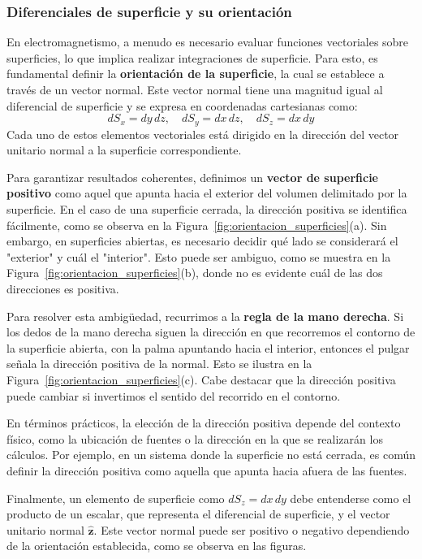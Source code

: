 \documentclass{book}
\begin{document}
\subsubsection{Diferenciales de superficie y su orientación}

En electromagnetismo, a menudo es necesario evaluar funciones vectoriales sobre superficies, lo que implica realizar integraciones de superficie. Para esto, es fundamental definir la \textbf{orientación de la superficie}, la cual se establece a través de un vector normal. Este vector normal tiene una magnitud igual al diferencial de superficie y se expresa en coordenadas cartesianas como:
\begin{equation}
dS_x = dy\,dz, \quad dS_y = dx\,dz, \quad dS_z = dx\,dy
\end{equation}
Cada uno de estos elementos vectoriales está dirigido en la dirección del vector unitario normal a la superficie correspondiente.

Para garantizar resultados coherentes, definimos un \textbf{vector de superficie positivo} como aquel que apunta hacia el exterior del volumen delimitado por la superficie. En el caso de una superficie cerrada, la dirección positiva se identifica fácilmente, como se observa en la Figura~\ref{fig:orientacion_superficies}(a). Sin embargo, en superficies abiertas, es necesario decidir qué lado se considerará el "exterior" y cuál el "interior". Esto puede ser ambiguo, como se muestra en la Figura~\ref{fig:orientacion_superficies}(b), donde no es evidente cuál de las dos direcciones es positiva.

Para resolver esta ambigüedad, recurrimos a la \textbf{regla de la mano derecha}. Si los dedos de la mano derecha siguen la dirección en que recorremos el contorno de la superficie abierta, con la palma apuntando hacia el interior, entonces el pulgar señala la dirección positiva de la normal. Esto se ilustra en la Figura~\ref{fig:orientacion_superficies}(c). Cabe destacar que la dirección positiva puede cambiar si invertimos el sentido del recorrido en el contorno.

En términos prácticos, la elección de la dirección positiva depende del contexto físico, como la ubicación de fuentes o la dirección en la que se realizarán los cálculos. Por ejemplo, en un sistema donde la superficie no está cerrada, es común definir la dirección positiva como aquella que apunta hacia afuera de las fuentes.

Finalmente, un elemento de superficie como \( dS_z = dx\,dy \) debe entenderse como el producto de un escalar, que representa el diferencial de superficie, y el vector unitario normal \( \mathbf{\hat{z}} \). Este vector normal puede ser positivo o negativo dependiendo de la orientación establecida, como se observa en las figuras.
\end{document}
